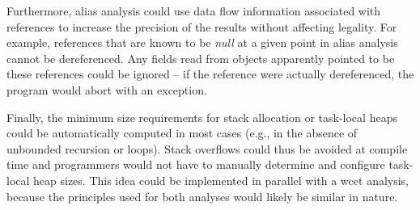		Furthermore, alias analysis could use data flow information associated with references to increase the precision of
		the results without affecting legality. For example, references that are known to be \emph{null} at a given point in
		alias analysis cannot be dereferenced. Any fields read from objects apparently pointed to be these references could
		be ignored – if the reference were actually dereferenced, the program would abort with an exception.

		Finally, the minimum size requirements for stack allocation or task-local heaps could be automatically computed in
		most cases (e.g., in the absence of unbounded recursion or loops). Stack overflows could thus be avoided at compile
		time and programmers would not have to manually determine and configure task-local heap sizes. This idea could be
		implemented in parallel with a \gls{wcet} analysis, because the principles used for both analyses would likely be
		similar in nature.
